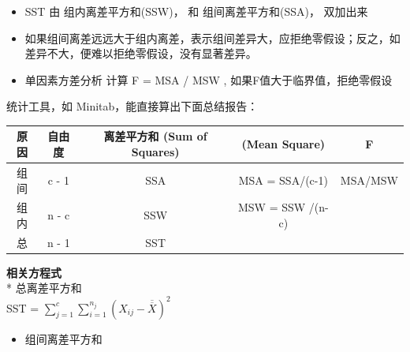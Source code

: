 \begin{description}
\begin{description}
\begin{itemize}
\tightlist
\item
  SST 由 组内离差平方和(SSW)， 和 组间离差平方和(SSA)， 双加出来
\end{itemize}

\begin{itemize}
\tightlist
\item
  如果组间离差远远大于组内离差，表示组间差异大，应拒绝零假设；反之，如差异不大，便难以拒绝零假设，没有显著差异。
\end{itemize}

\begin{itemize}
\tightlist
\item
  单因素方差分析 计算 F = MSA / MSW , 如果F值大于临界值，拒绝零假设
\end{itemize}

统计工具，如 Minitab，能直接算出下面总结报告：\\



\begin{tabular}{|c|c|c|c|c|}
\hline
原因&自由度&离差平方和 (Sum of Squares)&(Mean Square)&F\\
\hline
组间&c - 1&SSA&MSA = SSA/(c-1)&MSA/MSW \\
\hline
组内&n - c&SSW&MSW = SSW /(n-c)&\:\\
\hline
总&n - 1&SST&\:&\:\\
\hline
\end{tabular}


\textbf{相关方程式}\\
* 总离差平方和\\
SST =
\(\sum_{j=1}^c \sum_{i=1}^{n_j} (X_{ij} - \overline{\overline{X}})^2\)
\end{description}
\end{description}

\begin{description}
\item[]
\end{description}

\begin{itemize}
\tightlist
\item
  组间离差平方和\\
\end{itemize}

